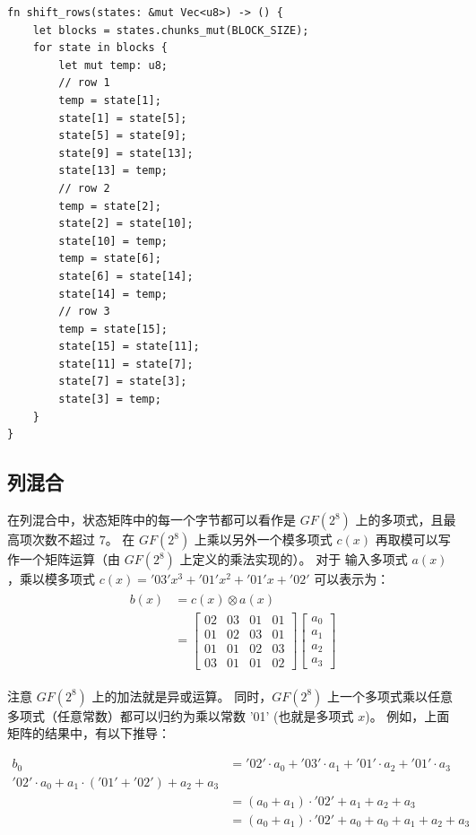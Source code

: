 \documentclass[degree=project,degree-type=project,cjk-font=noto]{thuthesis}
\begin{document}
  \begin{verbatim}
fn shift_rows(states: &mut Vec<u8>) -> () {
    let blocks = states.chunks_mut(BLOCK_SIZE);
    for state in blocks {
        let mut temp: u8;
        // row 1
        temp = state[1];
        state[1] = state[5];
        state[5] = state[9];
        state[9] = state[13];
        state[13] = temp;
        // row 2
        temp = state[2];
        state[2] = state[10];
        state[10] = temp;
        temp = state[6];
        state[6] = state[14];
        state[14] = temp;
        // row 3
        temp = state[15];
        state[15] = state[11];
        state[11] = state[7];
        state[7] = state[3];
        state[3] = temp;
    }
}
  \end{verbatim}

\subsection{列混合}

在列混合中，状态矩阵中的每一个字节都可以看作是 $GF(2^8)$ 上的多项式，且最高项次数不超过 $7$。
在 $GF(2^8)$ 上乘以另外一个模多项式 $c(x)$ 再取模可以写作一个矩阵运算（由 $GF(2^8)$ 上定义的乘法实现的）。
对于 输入多项式 $a(x)$，乘以模多项式 $c(x) = '03'x^3+'01'x^2+'01'x+'02'$ 可以表示为：
\begin{align}
  \begin{split}
    b(x) &= c(x) \otimes a(x) \\
    &= \begin{bmatrix}
      02 & 03 & 01 & 01 \\
      01 & 02 & 03 & 01 \\
      01 & 01 & 02 & 03 \\
      03 & 01 & 01 & 02
    \end{bmatrix} \begin{bmatrix}
      a_0 \\
      a_1 \\
      a_2 \\
      a_3
    \end{bmatrix}
  \end{split}
\end{align}

注意 $GF(2^8)$ 上的加法就是异或运算。
同时，$GF(2^8)$ 上一个多项式乘以任意多项式（任意常数）都可以归约为乘以常数 '01' (也就是多项式 $x$)。
例如，上面矩阵的结果中，有以下推导：

\begin{align*}
    b_0 &= '02' \cdot a_0 + '03' \cdot a_1 + '01' \cdot a_2 + '01' \cdot a_3 \\
    '02' \cdot a_0 + a_1 \cdot ('01' + '02') + a_2 + a_3 \\
    &= (a_0 + a_1) \cdot '02' + a_1 + a_2 + a_3 \\
    &= (a_0 + a_1) \cdot '02' + a_0 + a_0 + a_1 + a_2 + a_3
\end{align*}
\end{document}
